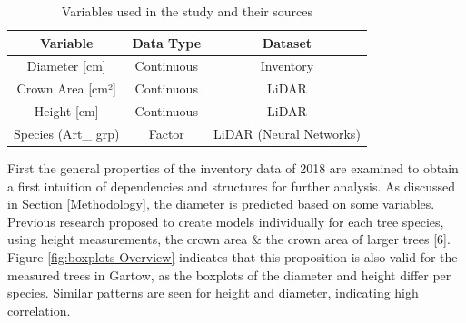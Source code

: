 
\begin{table}[H]
\setlength\arrayrulewidth{1pt}  
\centering
\begin{adjustbox}{max width=\textwidth}
\begin{tabular}{|c|c|c|}
\hline
\rowcolor{Gray}
\textbf{Variable}    & \textbf{Data Type} & \textbf{Dataset}       \\ \hline
Diameter {[}cm{]}    & Continuous         & Inventory              \\ \hline
Crown Area {[}cm²{]} & Continuous         & LiDAR                  \\ \hline
Height {[}cm{]}      & Continuous         & LiDAR                  \\ \hline
Species (Art\_ grp)  & Factor             & LiDAR (Neural Networks) \\ \hline
\end{tabular}
\end{adjustbox}

\caption{Variables used in the study and their sources}
\label{tab:variables}
\end{table}

First the general properties of the inventory data of 2018 are examined to obtain a first intuition of dependencies
and structures for further analysis. As discussed in Section \ref{Methodology}, the diameter is predicted based on some
variables. Previous research proposed to create models individually for each tree species, using height
measurements, the crown area \& the crown area of larger trees [6].\\

Figure \ref{fig:boxplots Overview} indicates that this proposition is also valid for the measured trees in Gartow, as the boxplots of the
diameter and height differ per species. Similar patterns are seen for height and diameter,
indicating high correlation.

